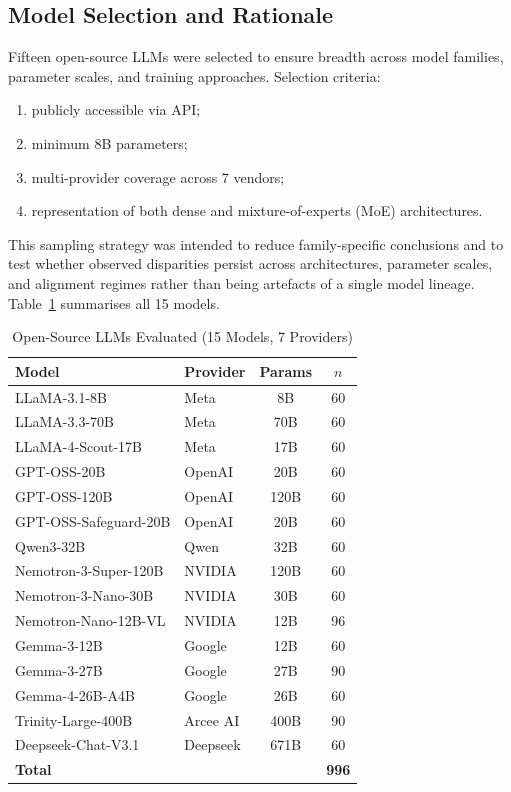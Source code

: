 \documentclass[conference]{IEEEtran}
\begin{document}
\subsection{Model Selection and Rationale}
Fifteen open-source LLMs were selected to ensure breadth across model families, parameter scales, and training approaches. 
Selection criteria:
\begin{enumerate}
    \item publicly accessible via API;
    \item minimum 8B parameters;
    \item multi-provider coverage across 7 vendors;
    \item representation of both dense and mixture-of-experts (MoE) architectures.
\end{enumerate}
This sampling strategy was intended to reduce family-specific conclusions and to test whether observed disparities persist across architectures, parameter scales, and alignment regimes rather than being artefacts of a single model lineage.
Table~\ref{tab:models} summarises all 15 models.

\begin{table}[htbp]
\caption{Open-Source LLMs Evaluated (15 Models, 7 Providers)}
\label{tab:models}
\begin{center}
\renewcommand{\arraystretch}{1.5}
\begin{tabular}{|l|l|c|c|}
\hline
\textbf{Model} & \textbf{Provider} & \textbf{Params} & \textbf{$n$} \\
\hline
LLaMA-3.1-8B           & Meta      & 8B    & 60  \\
LLaMA-3.3-70B          & Meta      & 70B   & 60  \\
LLaMA-4-Scout-17B      & Meta      & 17B   & 60  \\
GPT-OSS-20B            & OpenAI    & 20B   & 60  \\
GPT-OSS-120B           & OpenAI    & 120B  & 60  \\
GPT-OSS-Safeguard-20B  & OpenAI    & 20B   & 60  \\
Qwen3-32B              & Qwen      & 32B   & 60  \\
Nemotron-3-Super-120B  & NVIDIA    & 120B  & 60  \\
Nemotron-3-Nano-30B    & NVIDIA    & 30B   & 60  \\
Nemotron-Nano-12B-VL   & NVIDIA    & 12B   & 96  \\
Gemma-3-12B            & Google    & 12B   & 60  \\
Gemma-3-27B            & Google    & 27B   & 90  \\
Gemma-4-26B-A4B        & Google    & 26B   & 60  \\
Trinity-Large-400B     & Arcee AI  & 400B  & 90  \\
Deepseek-Chat-V3.1     & Deepseek  & 671B  & 60  \\
\hline
\multicolumn{3}{|l|}{\textbf{Total}} & \textbf{996} \\
\hline
\end{tabular}
\end{center}
\end{table}
\end{document}
